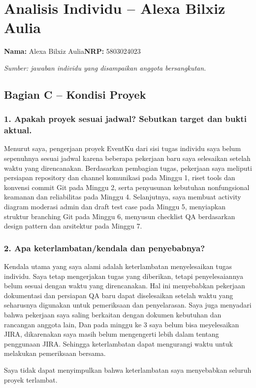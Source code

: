 \documentclass[11pt,a4paper]{article}
\newcommand{\page}[1]{\clearpage\section{#1}}
\begin{document}
\page{Analisis Individu -- Alexa Bilxiz Aulia}
\textbf{Nama:} Alexa Bilxiz Aulia\quad\textbf{NRP:} 5803024023

\textit{Sumber: jawaban individu yang disampaikan anggota bersangkutan.} \cite{alexaind}

\subsection*{Bagian C -- Kondisi Proyek}
\subsubsection*{1. Apakah proyek sesuai jadwal? Sebutkan target dan bukti aktual.}

Menurut saya, pengerjaan proyek EventKu dari sisi tugas individu saya belum sepenuhnya sesuai jadwal karena beberapa pekerjaan baru saya selesaikan setelah waktu yang direncanakan. Berdasarkan pembagian tugas, pekerjaan saya meliputi persiapan repository dan channel komunikasi pada Minggu 1, riset tools dan konvensi commit Git pada Minggu 2, serta penyusunan kebutuhan nonfungsional keamanan dan reliabilitas pada Minggu 4. Selanjutnya, saya membuat activity diagram moderasi admin dan draft test case pada Minggu 5, menyiapkan struktur branching Git pada Minggu 6, menyusun checklist QA berdasarkan design pattern dan arsitektur pada Minggu 7.



\subsubsection*{2. Apa keterlambatan/kendala dan penyebabnya?}

Kendala utama yang saya alami adalah keterlambatan menyelesaikan tugas individu. Saya tetap mengerjakan tugas yang diberikan, tetapi penyelesaiannya belum sesuai dengan waktu yang direncanakan. Hal ini menyebabkan pekerjaan dokumentasi dan persiapan QA baru dapat diselesaikan setelah waktu yang seharusnya digunakan untuk pemeriksaan dan penyelarasan. Saya juga menyadari bahwa pekerjaan saya saling berkaitan dengan dokumen kebutuhan dan rancangan anggota lain, Dan pada minggu ke 3 saya belum bisa meyelesaikan JIRA, dikarenakan saya masih belum mengengerti lebih dalam tentang penggunaan JIRA. Sehingga keterlambatan dapat mengurangi waktu untuk melakukan pemeriksaan bersama.

Saya tidak dapat menyimpulkan bahwa keterlambatan saya menyebabkan seluruh proyek terlambat.
\end{document}
